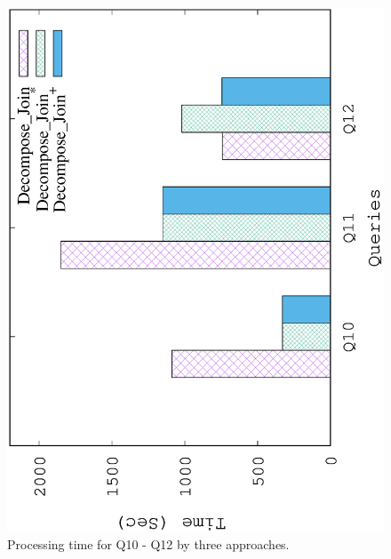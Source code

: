 \begin{figure}[H]
\centering
\includegraphics[scale=0.5, angle=270]{plot/threeall}
\caption{Processing time for Q10 - Q12 by three approaches.}
\label{fig:threeall}
\end{figure}


